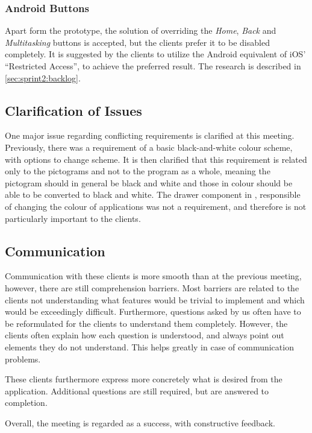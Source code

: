 \subsubsection{Android Buttons}
Apart form the prototype, the solution of overriding the \textit{Home}, \textit{Back} and \textit{Multitasking} buttons is accepted, but the clients prefer it to be disabled completely.
It is suggested by the clients to utilize the Android equivalent of iOS' ``Restricted Access'', to achieve the preferred result.
The research is described in \cref{sec:sprint2:backlog}.

\subsection{Clarification of Issues}\label{sec:sprint2:clarification}
One major issue regarding conflicting requirements is clarified at this meeting.
Previously, there was a requirement of a basic black-and-white colour scheme, with options to change scheme.
It is then clarified that this requirement is related only to the pictograms and not to the program as a whole, meaning the pictogram should in general be black and white and those in colour should be able to be converted to black and white.
The drawer component in \launcher, responsible of changing the colour of applications was not a requirement, and therefore is not particularly important to the clients.

\subsection{Communication}
Communication with these clients is more smooth than at the previous meeting, however, there are still comprehension barriers.
Most barriers are related to the clients not understanding what features would be trivial to implement and which would be exceedingly difficult.
Furthermore, questions asked by us often have to be reformulated for the clients to understand them completely.
However, the clients often explain how each question is understood, and always point out elements they do not understand.
This helps greatly in case of communication problems.

These clients furthermore express more concretely what is desired from the application.
Additional questions are still required, but are answered to completion.

Overall, the meeting is regarded as a success, with constructive feedback.